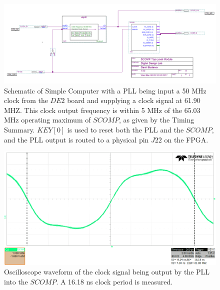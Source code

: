 \documentclass{article}
\begin{document}
	\begin{figure}%
		\vspace{48pt}
		\includegraphics[scale=0.5,center]{schematic.PNG} %
		\captionsetup{width=1.55\textwidth, labelfont=bf,singlelinecheck=true, justification=justified}
		\caption{Schematic of Simple Computer with a PLL being input a 50 MHz clock from the $DE2$ board and supplying a clock signal at 61.90 MHZ. This clock output frequency is within 5 MHz of the 65.03 MHz operating maximum of $SCOMP$, as given by the Timing Summary. $KEY[0]$ is used to reset both the PLL and the $SCOMP$, and the PLL output is routed to a physical pin $J22$ on the FPGA.}
	\end{figure}
		\vspace{3pt}
	\begin{figure}[ht]%
		\includegraphics[scale=0.5,center]{clock_freq.png} %
		\captionsetup{width=1.55\textwidth, labelfont=bf,singlelinecheck=true, justification=justified}
		\caption{Oscilloscope waveform of the clock signal being output by the PLL into the $SCOMP$. A 16.18 ns clock period is measured.}
	\end{figure}
\end{document}
